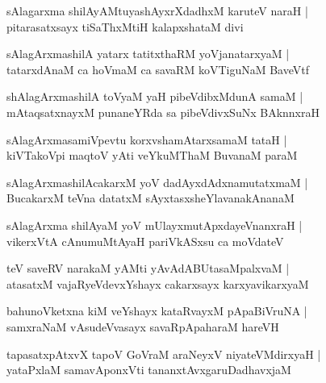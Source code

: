 \documentclass[twoside,12pt,openright]{book}
\newcounter{shloka}[chapter]
\begin{document}
\begin{shloka}
sAlagarxma shilAyAMtuyashAyxrXdadhxM karuteV naraH |\\
pitarasatxsayx tiSaThxMtiH kalapxshataM divi
\end{shloka}

\begin{shloka}
sAlagArxmashilA yatarx tatitxthaRM yoVjanatarxyaM |\\
tatarxdAnaM ca hoVmaM ca savaRM koVTiguNaM BaveVtf 
\end{shloka}

\begin{shloka}
shAlagArxmashilA toVyaM yaH pibeVdibxMdunA samaM |\\
mAtaqsatxnayxM punaneYRda sa pibeVdivxSuNx BAknnxraH 
\end{shloka}

\begin{shloka}
sAlagArxmasamiVpevtu korxvshamAtarxsamaM tataH |\\
kiVTakoVpi maqtoV yAti veYkuMThaM BuvanaM paraM 
\end{shloka}

\begin{shloka}
sAlagArxmashilAcakarxM yoV dadAyxdAdxnamutatxmaM |\\
BucakarxM teVna datatxM sAyxtasxsheYlavanakAnanaM 
\end{shloka}

\begin{shloka}
sAlagArxma shilAyaM yoV mUlayxmutApxdayeVnanxraH |\\
vikerxVtA cAnumuMtAyaH pariVkASxsu ca moVdateV 
\end{shloka}

\begin{shloka}
teV saveRV narakaM yAMti yAvAdABUtasaMpalxvaM |\\
atasatxM vajaRyeVdevxYshayx cakarxsayx karxyavikarxyaM 
\end{shloka}

\begin{shloka}
bahunoVketxna kiM veYshayx kataRvayxM pApaBiVruNA |\\
samxraNaM vAsudeVvasayx savaRpApaharaM hareVH \\
\end{shloka}

\begin{shloka}
tapasatxpAtxvX tapoV GoVraM araNeyxV niyateVMdirxyaH |\\
yataPxlaM samavAponxVti tananxtAvxgaruDadhavxjaM 
\end{shloka}
\end{document}
